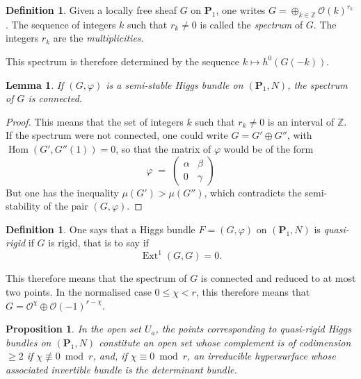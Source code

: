 \documentclass[12pt,english]{smfart}%
\theoremstyle{plain}
\newtheorem{proposition}[theorem]{Proposition}
\newtheorem{lemma}[theorem]{Lemma}
\theoremstyle{definition}
\newtheorem{definition}[theorem]{Definition}
\theoremstyle{remark}
\newcommand{\PP}{\mathbf{P}}
\newcommand{\ZZ}{\mathbb{Z}}
\newcommand{\Oh}{\mathcal{O}}
\DeclareMathOperator{\Hom}{Hom}
\DeclareMathOperator{\Ext}{Ext}
\newcommand{\origpage}[1]{\marginnote{\scriptsize\itshape p.~#1}}
\begin{document}
\begin{definition}\label{def:spectrum}
Given a locally free sheaf $G$ on $\PP_{1}$, one writes $G=\oplus_{k\in\ZZ}\Oh(k)^{r_{k}}$. The sequence of integers $k$ such that $r_{k}\neq 0$ is called the \emph{spectrum} of $G$. The integers $r_{k}$ are the \emph{multiplicities}.
\end{definition}

This spectrum is therefore determined by the sequence $k\mapsto h^{0}(G(-k))$.

\begin{lemma}\label{lem:spectrum-connected}
If $(G,\varphi)$ is a semi-stable Higgs bundle on $(\PP_{1},N)$, the spectrum of $G$ is connected.
\end{lemma}

\begin{proof}
This means that the set of integers $k$ such that $r_{k}\neq 0$ is an interval of $\ZZ$. If the spectrum were not connected, one could write $G=G'\oplus G''$, with $\Hom(G',G''(1))=0$, so that the matrix of $\varphi$ would be of the form
\[
\varphi \;=\; \begin{pmatrix} \alpha & \beta \\ 0 & \gamma \end{pmatrix}
\]
But one has the inequality $\mu(G')>\mu(G'')$, which contradicts the semi-stability of the pair $(G,\varphi)$.
\end{proof}

\begin{definition}\label{def:quasirigid}
One says that a Higgs bundle $F=(G,\varphi)$ on $(\PP_{1},N)$ is \emph{quasi-rigid} if $G$ is rigid, that is to say if
\[
\Ext^{1}(G,G)=0 .
\]
\end{definition}

\origpage{649}
This therefore means that the spectrum of $G$ is connected and reduced to at most two points. In the normalised case $0\leq\chi<r$, this therefore means that $G=\Oh^{\chi}\oplus\Oh(-1)^{r-\chi}$.

\begin{proposition}\label{prop:quasirigid-open}
In the open set $U_{a}$, the points corresponding to quasi-rigid Higgs bundles on $(\PP_{1},N)$ constitute an open set whose complement is of codimension $\geq 2$ if $\chi\not\equiv 0 \bmod r$, and, if $\chi\equiv 0\bmod r$, an irreducible hypersurface whose associated invertible bundle is the determinant bundle.
\end{proposition}
\end{document}
